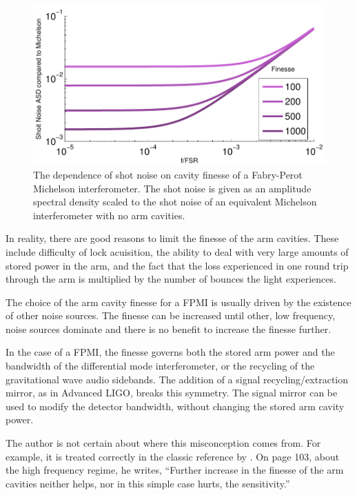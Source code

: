 \begin{figure}
  \begin{center}
  \leavevmode
  \includegraphics{figs-ap-miscon/fpmishotnoise.pdf}
  \end{center}
  \caption[The dependence of shot noise on cavity finesse of a Fabry-Perot Michelson interferometer.]{The dependence of shot noise on cavity finesse of a Fabry-Perot Michelson interferometer. The shot noise is given as an amplitude spectral density scaled to the shot noise of an equivalent Michelson interferometer with no arm cavities.}
  \label{fig:fpmishotnoise}
\end{figure}

In reality, there are good reasons to limit the finesse of the arm cavities. %
These include difficulty of lock acuisition, the ability to deal with very large amounts of stored power in the arm, and the fact that the loss experienced in one round trip through the arm is multiplied by the number of bounces the light experiences.

The choice of the arm cavity finesse for a FPMI is usually driven by the existence of other noise sources. %
The finesse can be increased until other, low frequency, noise sources dominate and there is no benefit to increase the finesse further.

In the case of a FPMI, the finesse governs both the stored arm power and the bandwidth of the differential mode interferometer, or the recycling of the gravitational wave audio sidebands. %
The addition of a signal recycling/extraction mirror, as in Advanced LIGO, breaks this symmetry. %
The signal mirror can be used to modify the detector bandwidth, without changing the stored arm cavity power.

The author is not certain about where this misconception comes from. %
For example, it is treated correctly in the classic reference by \citet{saulson1994fundamentals}. %
On page 103, about the high frequency regime, he writes, ``Further increase in the finesse of the arm cavities neither helps, nor in this simple case hurts, the sensitivity.''

